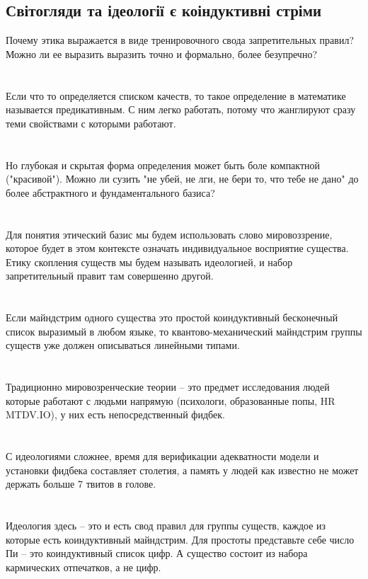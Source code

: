 \subsection{Світогляди та ідеології є коіндуктивні стріми}

Почему этика выражается в виде тренировочного свода запретительных правил? Можно ли ее выразить выразить точно и формально, более безупречно?\\
\\
\\
Если что то определяется списком качеств, то такое определение в математике называется предикативным. С ним легко работать, потому что жанглируют сразу теми свойствами с которыми работают.\\
\\
\\
Но глубокая и скрытая форма определения может быть боле компактной ("красивой"). Можно ли сузить "не убей, не лги, не бери то, что тебе не дано" до более абстрактного и фундаментального базиса?\\
\\
\\
Для понятия этический базис мы будем использовать слово мировоззрение, которое будет в этом контексте означать индивидуальное восприятие существа. Етику скопления существ мы будем называть идеологией, и набор запретительный правит там совершенно другой.\\
\\
\\
Если майндстрим одного существа это простой коиндуктивный бесконечный список выразимый в любом языке, то квантово-механический майндстрим группы существ уже должен описываться линейными типами.\\
\\
\\
Традиционно мировозренческие теории -- это предмет исследования людей которые работают с людьми напрямую (психологи, образованные попы, HR MTDV.IO), у них есть непосредственный фидбек.\\
\\
\\
С идеологиями сложнее, время для верификации адекватности модели и установки фидбека составляет столетия, а память у людей как известно не может держать больше 7 твитов в голове.\\
\\
\\
Идеология здесь -- это и есть свод правил для группы существ, каждое из которые есть коиндуктивный майндстрим. Для простоты представьте себе число Пи -- это коиндуктивный список цифр. А существо состоит из набора кармических отпечатков, а не цифр.\\
